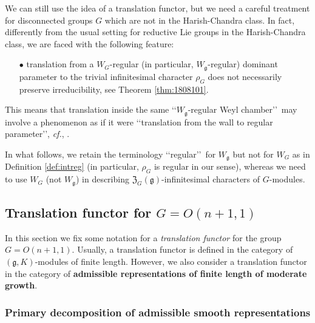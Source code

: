 We can still use the idea of a translation functor,
 but we need a careful treatment
 for disconnected groups $G$
 which are not in the Harish-Chandra class.  
In fact,
 differently from the usual setting for reductive Lie groups
 in the Harish-Chandra class, 
 we are faced with the following feature:
\begin{enumerate}
\item[$\bullet$]
translation from a
 $W_G$-regular
 (in particular, 
$W_{\mathfrak{g}}$-regular) dominant parameter
 to the trivial infinitesimal character $\rho_G$ 
 does not necessarily preserve irreducibility, 
 see Theorem \ref{thm:1808101}. 
\end{enumerate}
This means that translation inside the same \lq\lq{$W_{\mathfrak{g}}$-regular Weyl chamber}\rq\rq\
 may involve a phenomenon 
 as if it were \lq\lq{translation from the wall 
 to regular parameter}\rq\rq, 
 {\it{cf.}},  \cite{SpehVogan}.  


In what follows,
 we retain the terminology
 \lq\lq{regular}\rq\rq\ for $W_{\mathfrak{g}}$
 but not for $W_G$
 as in Definition \ref{def:intreg}
 (in particular, $\rho_G$ is regular in our sense), 
 whereas we need to use $W_G$
 (not $W_{\mathfrak{g}}$)
 in describing ${\mathfrak{Z}}_G({\mathfrak{g}})$-infinitesimal characters
 of $G$-modules.  



\subsection{Translation functor for $G=O(n+1,1)$}

In this section 
we fix some notation
 for a 
{\it{translation functor}}
 for the group $G=O(n+1,1)$.  
Usually, 
 a translation functor is defined in the category 
 of $({\mathfrak{g}},K)$-modules
 of finite length.  
However, 
 we also consider a translation functor
  in the category of {\bf{admissible representations
 of finite length of moderate growth}}.  



\subsubsection{Primary decomposition of admissible smooth representations}
\label{subsec:primary}

